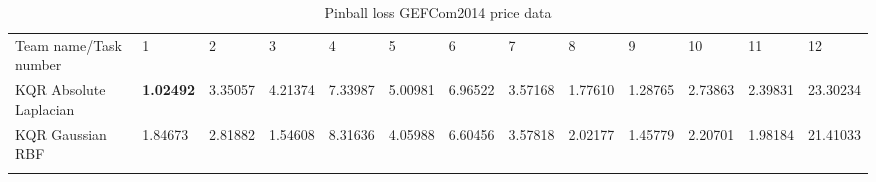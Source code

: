 \begin{table}[!ht]
    \centering
    \caption{Pinball loss GEFCom2014 price data}
    \label{tab:pinball loss gefcom2014 price data}
    \begin{adjustbox}{width=\textwidth}
    \begin{tabular}{lllllllllllll}
      \toprule
      \midrule
      Team name/Task number                       & 1                               & 2                                  & 3                               & 4                              & 5                              & 6       & 7                               & 8       & 9       & 10                             & 11                             & 12               \\
  KQR Absolute Laplacian
  &
  \textbf{1.02492}
  &
  3.35057
  &
  4.21374
  &
  7.33987
  &
  5.00981
  &
  6.96522
  &
  3.57168
  &
  1.77610
  &
  1.28765
  &
  2.73863
  &
  2.39831
  &
  23.30234
  \\
  KQR Gaussian RBF
  &
  1.84673
  &
  2.81882
  &
  1.54608
  &
  8.31636
  &
  4.05988
  &
  6.60456
  &
  3.57818
  &
  2.02177
  &
  1.45779
  &
  2.20701
  &
  1.98184
  &
  21.41033
  \\
  \\
  

\end{tabular}
\end{adjustbox}
\end{table}
